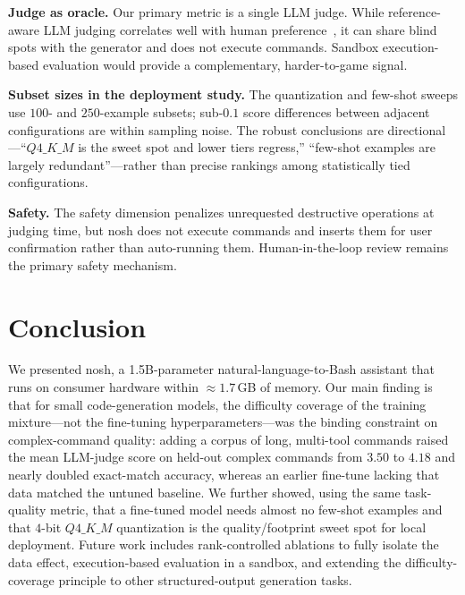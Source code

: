 \documentclass[conference]{IEEEtran}
\begin{document}
\textbf{Judge as oracle.} Our primary metric is a single LLM judge. While
reference-aware LLM judging correlates well with human
preference~\cite{zheng2023judge}, it can share blind spots with the generator
and does not execute commands. Sandbox execution-based evaluation would provide a
complementary, harder-to-game signal.

\textbf{Subset sizes in the deployment study.} The quantization and few-shot
sweeps use $100$- and $250$-example subsets; sub-$0.1$ score differences between
adjacent configurations are within sampling noise. The robust conclusions are
directional---``$Q4\_K\_M$ is the sweet spot and lower tiers regress,''
``few-shot examples are largely redundant''---rather than precise rankings among
statistically tied configurations.

\textbf{Safety.} The safety dimension penalizes unrequested destructive
operations at judging time, but nosh does not execute commands and inserts them
for user confirmation rather than auto-running them. Human-in-the-loop review
remains the primary safety mechanism.

\section{Conclusion}

We presented nosh, a 1.5B-parameter natural-language-to-Bash assistant that runs
on consumer hardware within $\approx 1.7$\,GB of memory. Our main finding is that
for small code-generation models, the difficulty coverage of the training
mixture---not the fine-tuning hyperparameters---was the binding constraint on
complex-command quality: adding a corpus of long, multi-tool commands raised the
mean LLM-judge score on held-out complex commands from $3.50$ to $4.18$ and
nearly doubled exact-match accuracy, whereas an earlier fine-tune lacking that
data matched the untuned baseline. We further showed, using the same
task-quality metric, that a fine-tuned model needs almost no few-shot examples
and that $4$-bit $Q4\_K\_M$ quantization is the quality/footprint sweet spot for
local deployment. Future work includes rank-controlled ablations to fully
isolate the data effect, execution-based evaluation in a sandbox, and extending
the difficulty-coverage principle to other structured-output generation tasks.
\end{document}
